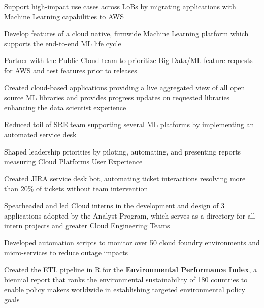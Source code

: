 \documentclass[]{deedy-resume-openfont}
\begin{document}
\begin{tightemize}
\item Support high-impact use cases across LoBs by migrating applications with Machine Learning capabilities to AWS
\item Develop features of a cloud native, firmwide Machine Learning platform which supports the end-to-end ML life cycle
\item Partner with the Public Cloud team to prioritize Big Data/ML feature requests for AWS and test features prior to releases
\item Created cloud-based applications providing a live aggregated view of all open source ML libraries and provides progress updates on requested libraries enhancing the data scientist experience
\item Reduced toil of SRE team supporting several ML platforms by implementing an automated service desk
\end{tightemize}
\begin{tightemize}
\item Shaped leadership priorities by piloting, automating, and presenting reports measuring Cloud Platforms User Experience
\item Created JIRA service desk bot, automating ticket interactions resolving more than 20\% of tickets without team intervention
\item Spearheaded and led Cloud interns in the development and design of 3 applications adopted by the Analyst Program, which serves as a directory for all intern projects and greater Cloud Engineering Teams
\item Developed automation scripts to monitor over 50 cloud foundry environments and micro-services to reduce outage impacts
\end{tightemize}
\sectionsep

\begin{tightemize}
\item Created the ETL pipeline in R for the \textbf{\href{https://epi.envirocenter.yale.edu/epi-team}{Environmental Performance Index}}, a biennial report that ranks the environmental sustainability of 180 countries to enable policy makers worldwide in establishing targeted environmental policy goals
\end{tightemize}
\sectionsep
\end{document}
